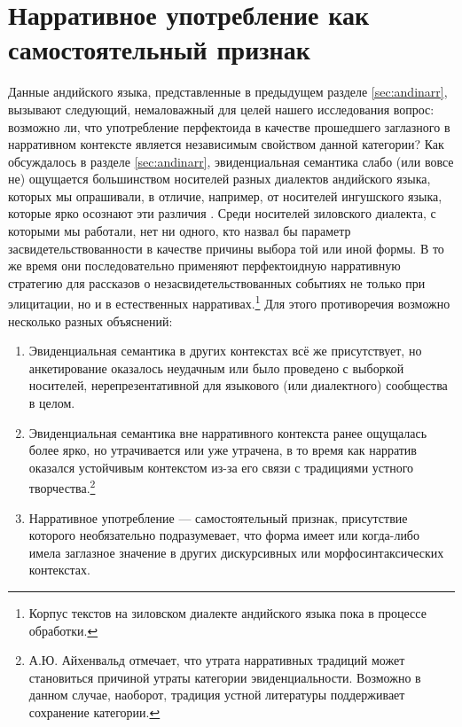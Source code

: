 \section{Нарративное употребление как самостоятельный признак} \label{sec:svod}

Данные андийского языка, представленные в предыдущем разделе \ref{sec:andinarr}, вызывают следующий, немаловажный для целей нашего исследования вопрос: возможно ли, что употребление перфектоида в качестве прошедшего заглазного в нарративном контексте является независимым свойством данной категории? Как обсуждалось в разделе \ref{sec:andinarr}, эвиденциальная семантика слабо (или вовсе не) ощущается большинством носителей разных диалектов андийского языка, которых мы опрашивали, в отличие, например, от носителей ингушского языка, которые ярко осознают эти различия \citep[243]{nichols2011}. Среди носителей зиловского диалекта, с которыми мы работали, нет ни одного, кто назвал бы параметр засвидетельствованности в качестве причины выбора той или иной формы. В то же время они последовательно применяют перфектоидную нарративную стратегию для рассказов о незасвидетельствованных событиях не только при элицитации, но и в естественных нарративах.\footnote{Корпус текстов на зиловском диалекте андийского языка пока в процессе обработки.} Для этого противоречия возможно несколько разных объяснений:

\pagebreak

\begin{enumerate}
    \item Эвиденциальная семантика в других контекстах всё же присутствует, но анкетирование оказалось неудачным или было проведено с выборкой носителей, нерепрезентативной для языкового (или диалектного) сообщества в целом.
    \item Эвиденциальная семантика вне нарративного контекста ранее ощущалась более ярко, но утрачивается или уже утрачена, в то время как нарратив оказался устойчивым контекстом из-за его связи с традициями устного творчества.\footnote{А.Ю. Айхенвальд \citep[301]{aikhenvald2004} отмечает, что утрата нарративных традиций может становиться причиной утраты категории эвиденциальности. Возможно в данном случае, наоборот, традиция устной литературы поддерживает сохранение категории.}
    \item Нарративное употребление --- самостоятельный признак, присутствие которого необязательно подразумевает, что форма имеет или когда-либо имела заглазное значение в других дискурсивных или морфосинтаксических контекстах.
\end{enumerate}

